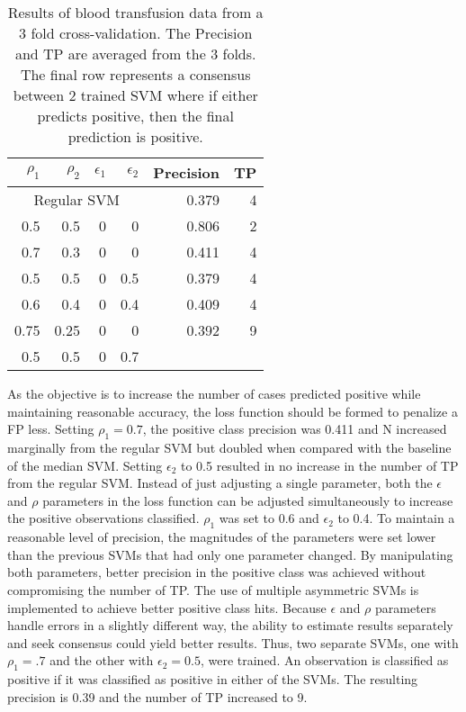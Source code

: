 \documentclass[twoside,11pt]{article}
\begin{document}
\begin{table}[htp]
\begin{tabular}{rrrr|rr}
\hline
$\rho_1$ & $\rho_2$ & $\epsilon_1$ & $\epsilon_2$ & Precision & TP \bigstrut\\
\hline
\hline
 \multicolumn{4}{c|}{Regular SVM}     & 0.379 & 4 \bigstrut\\
\hline
0.5   & 0.5   & 0     & 0     & 0.806 & 2 \bigstrut\\
\hline
0.7   & 0.3   & 0     & 0     & 0.411 & 4 \bigstrut\\
\hline
0.5   & 0.5   & 0     & 0.5   & 0.379 & 4 \bigstrut\\
\hline
0.6   & 0.4   & 0     & 0.4   & 0.409 & 4 \bigstrut\\
\hline
0.75  & 0.25  & 0     & 0     & 0.392 & 9 \bigstrut[t]\\
0.5   & 0.5   & 0     & 0.7   &       &  \bigstrut[b]\\
\hline
\hline
\end{tabular}%
\caption{Results of blood transfusion data from a 3 fold cross-validation. The Precision and TP are averaged from the 3 folds. The final row represents a consensus between 2 trained SVM where if either predicts positive, then the final prediction is positive.}
\label{bloodtransfusion}
\end{table}

As the objective is to increase the number of cases predicted positive while maintaining reasonable accuracy, the loss function should be formed to penalize a FP less. Setting $\rho_1=0.7$, the positive class precision was 0.411 and N increased marginally from the regular SVM but doubled when compared with the baseline of the median SVM. Setting $\epsilon_2$ to 0.5 resulted in no increase in the number of TP from the regular SVM. Instead of just adjusting a single parameter, both the $\epsilon$ and $\rho$ parameters in the loss function can be adjusted simultaneously to increase the positive observations classified. $\rho_1$ was set to 0.6 and $\epsilon_2$ to 0.4. To maintain a reasonable level of precision, the magnitudes of the parameters were set lower than the previous SVMs that had only one parameter changed. By manipulating both parameters, better precision in the positive class was achieved without compromising the number of TP. The use of multiple asymmetric SVMs is implemented to achieve better positive class hits. Because $\epsilon$ and $\rho$ parameters handle errors in a slightly different way, the ability to estimate results separately and seek consensus could yield better results. Thus, two separate SVMs, one with $\rho_1=.7$ and the other with $\epsilon_2=0.5$, were trained. An observation is classified as positive if it was classified as positive in either of the SVMs. The resulting precision is 0.39 and the number of TP increased to 9.
\end{document}
